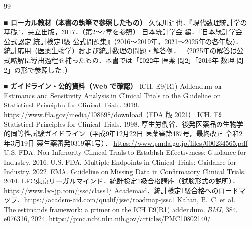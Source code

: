 \documentclass[a4paper,11pt,openany]{ltjsbook}
\begin{document}
\backmatter
\renewcommand{\bibname}{参考文献}
\begin{thebibliography}{99}

\item[] \textbf{■ ローカル教材（本書の執筆で参照したもの）}
 久保川達也．『現代数理統計学の基礎』．共立出版，2017．（第2〜7章を参照）
 日本統計学会 編．『日本統計学会公式認定 統計検定1級 公式問題集』（2016〜2019年，2021〜2025年の各年版）．
      統計応用（医薬生物学）および統計数理の問題・解答例．
      （2025年の解答は公式略解に導出過程を補ったもの．本書では「2022年 医薬 問2」「2016年 数理 問2」の形で参照した．）

\item[] \textbf{■ ガイドライン・公的資料（Web で確認）}
 ICH. E9(R1) Addendum on Estimands and Sensitivity Analysis in Clinical Trials to the Guideline on Statistical Principles for Clinical Trials. 2019.
      \url{https://www.fda.gov/media/108698/download}（FDA 版 2021）
 ICH. E9 Statistical Principles for Clinical Trials. 1998.
 厚生労働省．後発医薬品の生物学的同等性試験ガイドライン（平成9年12月22日 医薬審第487号，最終改正 令和2年3月19日 薬生薬審発0319第1号）．
      \url{https://www.pmda.go.jp/files/000234565.pdf}
 U.S. FDA. Non-Inferiority Clinical Trials to Establish Effectiveness: Guidance for Industry. 2016.
 U.S. FDA. Multiple Endpoints in Clinical Trials: Guidance for Industry. 2022.
 EMA. Guideline on Missing Data in Confirmatory Clinical Trials. 2010.
 LEC東京リーガルマインド．統計検定1級合格講座（試験形式の説明）．\url{https://www.lec-jp.com/jssc/class1/}
 Academaid．統計検定1級合格へのロードマップ．\url{https://academ-aid.com/qualif/jssc/roadmap-jssc1}
 Kahan, B.~C. et al. The estimands framework: a primer on the ICH E9(R1) addendum. \textit{BMJ}, 384, e076316, 2024.
      \url{https://pmc.ncbi.nlm.nih.gov/articles/PMC10802140/}


\end{thebibliography}
\end{document}
